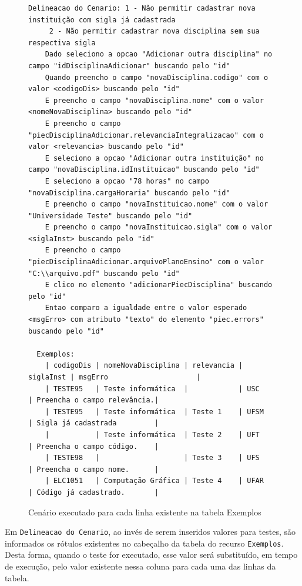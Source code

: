 \documentclass[tg]{mdtufsm}
\begin{document}
\begin{figure}[!htt]
	\begin{lstlisting}
Delineacao do Cenario: 1 - Não permitir cadastrar nova instituição com sigla já cadastrada
     2 - Não permitir cadastrar nova disciplina sem sua respectiva sigla
    Dado seleciono a opcao "Adicionar outra disciplina" no campo "idDisciplinaAdicionar" buscando pelo "id"
    Quando preencho o campo "novaDisciplina.codigo" com o valor <codigoDis> buscando pelo "id"
    E preencho o campo "novaDisciplina.nome" com o valor <nomeNovaDisciplina> buscando pelo "id"
    E preencho o campo "piecDisciplinaAdicionar.relevanciaIntegralizacao" com o valor <relevancia> buscando pelo "id"
    E seleciono a opcao "Adicionar outra instituição" no campo "novaDisciplina.idInstituicao" buscando pelo "id"
    E seleciono a opcao "78 horas" no campo "novaDisciplina.cargaHoraria" buscando pelo "id"
    E preencho o campo "novaInstituicao.nome" com o valor "Universidade Teste" buscando pelo "id"
    E preencho o campo "novaInstituicao.sigla" com o valor <siglaInst> buscando pelo "id"
    E preencho o campo "piecDisciplinaAdicionar.arquivoPlanoEnsino" com o valor "C:\\arquivo.pdf" buscando pelo "id"
    E clico no elemento "adicionarPiecDisciplina" buscando pelo "id"
    Entao comparo a igualdade entre o valor esperado <msgErro> com atributo "texto" do elemento "piec.errors" buscando pelo "id"

  Exemplos:
    | codigoDis | nomeNovaDisciplina | relevancia | siglaInst | msgErro                     |
    | TESTE95   | Teste informática  |            | USC       | Preencha o campo relevância.|
    | TESTE95   | Teste informática  | Teste 1    | UFSM      | Sigla já cadastrada         |
    |           | Teste informática  | Teste 2    | UFT       | Preencha o campo código.    |
    | TESTE98   |                    | Teste 3    | UFS       | Preencha o campo nome.      |
    | ELC1051   | Computação Gráfica | Teste 4    | UFAR      | Código já cadastrado.       |
	\end{lstlisting}
	\caption{Cenário executado para cada linha existente na tabela Exemplos}
	\label{code:Delineacao}
\end{figure}

Em \texttt{Delineacao do Cenario}, ao invés de serem inseridos valores para testes, são informados os rótulos existentes no cabeçalho da tabela do recurso \texttt{Exemplos}. Desta forma, quando o teste for executado, esse valor será substituído, em tempo de execução, pelo valor existente nessa coluna para cada uma das linhas da tabela.
\end{document}
